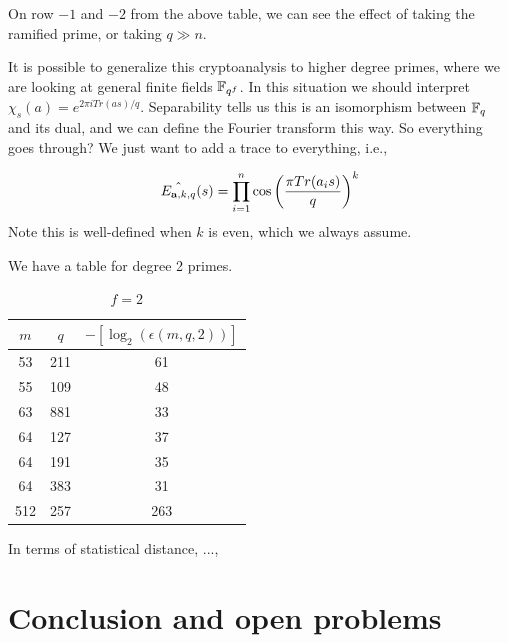 \documentclass{amsart}
\begin{document}
On row $-1$ and $-2$ from the above table, we can see the effect of taking the ramified prime, or taking $q \gg n$.



\begin{remark}
It is possible to generalize this cryptoanalysis to higher degree primes, where we are looking at general finite fields $\mathbb{F}_{q^f}$. In this situation we should interpret
$\chi_s(a) = e^{2 \pi i Tr(as)/q}$. Separability tells us this is an isomorphism between $\mathbb{F}_q$ and its dual, and we can define the Fourier transform this way. So everything goes through? We just want to add a trace to everything, i.e.,

\[
    \hat{E_{{\bf a}, k, q}}(s) = \prod_{i=1}^{n} \cos \left(\frac{ \pi Tr(a_i s) }{q} \right)^k
\]
Note this is well-defined when $k$ is even, which we always assume.
\end{remark}


We have a table for degree 2 primes.
\FloatBarrier
\begin{table}[H]
\caption{$f = 2$}
\begin{tabular}{c|c|c}
$m$ & $q$ & $-[\log_2(\epsilon(m,q,2))]$ \\
\hline
53 & 211 & 61 \\
55 & 109 & 48 \\
63 & 881 & 33 \\
64 & 127 & 37 \\
64 & 191 & 35 \\
64 & 383 & 31 \\
512 & 257 & 263
\end{tabular}
\end{table}

In terms of statistical distance, ...,

\section{Conclusion and open problems}



\end{document}
